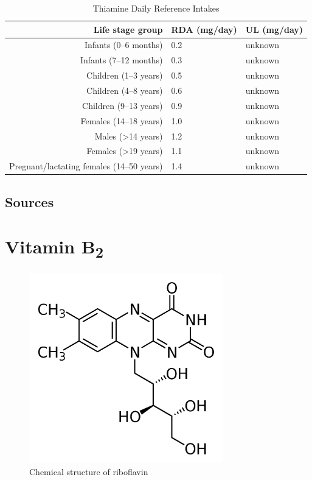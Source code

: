 \documentclass{book}
\begin{document}
\begin{table}[h]
	\caption{Thiamine Daily Reference Intakes}
	\centering \begin{tabular}{| r | l | l |}
		\hline
		\textbf{Life stage group} & \textbf{RDA (mg/day)} & \textbf{UL (mg/day)}\\ \hline
		Infants (0--6 months) & 0.2 & unknown\\ \hline
		Infants (7--12 months) & 0.3 & unknown\\ \hline
		Children (1--3 years) & 0.5 & unknown\\ \hline
		Children (4--8 years) & 0.6 & unknown\\ \hline
		Children (9--13 years) & 0.9 & unknown\\ \hline
		Females (14--18 years) & 1.0 & unknown\\ \hline
		Males (\textgreater14 years) & 1.2 & unknown\\ \hline
		Females (\textgreater19 years) & 1.1 & unknown\\ \hline
		Pregnant/lactating females (14--50 years) & 1.4 & unknown\\ \hline
	\end{tabular}
\end{table}
\newpage

\section{Sources}


\chapter{Vitamin B\textsubscript{2}}
\begin{figure}[h]
	\caption{Chemical structure of riboflavin}
	\centering \includegraphics[width=0.75\textwidth]{images/Vitamin_B2_chemical_structure}
\end{figure}
\end{document}
